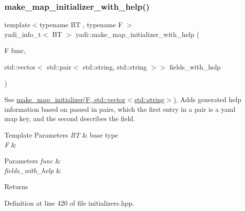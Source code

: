\subsubsection{\texorpdfstring{make\+\_\+map\+\_\+initializer\+\_\+with\+\_\+help()}{make\_map\_initializer\_with\_help()}\hspace{0.1cm}{\footnotesize\ttfamily [2/3]}}
{\footnotesize\ttfamily template$<$typename BT , typename F $>$ \\
yadi\+\_\+info\+\_\+t$<$ BT $>$ yadi\+::make\+\_\+map\+\_\+initializer\+\_\+with\+\_\+help (\begin{DoxyParamCaption}\item[{F}]{func,  }\item[{std\+::vector$<$ std\+::pair$<$ std\+::string, std\+::string $>$$>$}]{fields\+\_\+with\+\_\+help }\end{DoxyParamCaption})}



See \hyperlink{namespaceyadi_a904dc2ee15dbdedd1b2dac4e0420fe15}{make\+\_\+map\+\_\+initializer(\+F, std\+::vector$<$std\+::string$>$)}. Adds generated help information based on passed in pairs, which the first entry in a pair is a yaml map key, and the second describes the field. 


\begin{DoxyTemplParams}{Template Parameters}
{\em BT} & base type \\
\hline
{\em F} & \\
\hline
\end{DoxyTemplParams}

\begin{DoxyParams}{Parameters}
{\em func} & \\
\hline
{\em fields\+\_\+with\+\_\+help} & \\
\hline
\end{DoxyParams}
\begin{DoxyReturn}{Returns}

\end{DoxyReturn}


Definition at line 420 of file initializers.\+hpp.

\mbox{\label{namespaceyadi_aa63cb736dc5f8cbf6f6aad126825ab3d}} 
